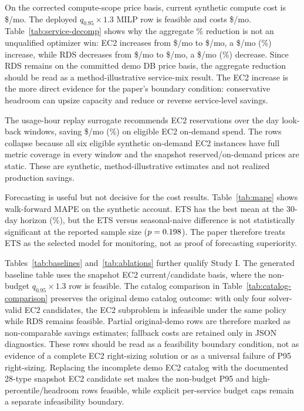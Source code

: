 \documentclass[conference]{IEEEtran}
\begin{document}
On the corrected compute-scope price basis, current synthetic compute cost is
\$\evidComputeCurrent{}/mo. The deployed $q_{0.95}\times1.3$ MILP row is
feasible and costs \$\evidPfiveCost{}/mo. Table~\ref{tab:service-decomp}
shows why the aggregate \evidPfiveSavingsPct\% reduction is not an
unqualified optimizer win: EC2 increases from \$\evidEcTwoCurrent{}/mo to
\$\evidEcTwoOptimized{}/mo, a \$\evidEcTwoDelta{}/mo
(\evidEcTwoDeltaPct\%) increase, while RDS decreases from
\$\evidRdsCurrent{}/mo to \$\evidRdsOptimized{}/mo, a
\$\evidRdsSavings{}/mo (\evidRdsSavingsPct\%) decrease. Since RDS remains on
the committed demo DB price basis, the aggregate reduction should be read as
a method-illustrative service-mix result. The EC2 increase is the more direct
evidence for the paper's boundary condition: conservative headroom can upsize
capacity and reduce or reverse service-level savings.

The usage-hour replay surrogate recommends \evidCommercialRecs{} EC2
reservations over the \evidCommercialLookbacks{} day look-back windows,
saving \$\evidCommercialSavings{}/mo (\evidCommercialSavingsPct\%) on
eligible EC2 on-demand spend. The rows collapse because all six eligible
synthetic on-demand EC2 instances have full metric coverage in every window
and the snapshot reserved/on-demand prices are static. These are synthetic,
method-illustrative estimates and not realized production savings.

Forecasting is useful but not decisive for the cost results. Table~\ref{tab:mape}
shows walk-forward MAPE on the synthetic account. ETS has the best mean at
the 30-day horizon (\mapeEts\%), but the ETS versus seasonal-naive difference
is not statistically significant at the reported sample size
($p=0.198$). The paper therefore treats ETS as the selected model for
monitoring, not as proof of forecasting superiority.

Tables~\ref{tab:baselines} and~\ref{tab:ablations} further qualify Study I.
The generated baseline table uses the snapshot EC2 current/candidate basis,
where the non-budget $q_{0.95}\times1.3$ row is feasible. The catalog
comparison in Table~\ref{tab:catalog-comparison} preserves the original demo
catalog outcome: with only four solver-valid EC2 candidates, the EC2
subproblem is infeasible under the same policy while RDS remains feasible.
Partial original-demo rows are therefore marked as non-comparable savings
estimates; fallback costs are retained only in JSON diagnostics. These rows
should be read as a feasibility boundary condition, not as evidence of a
complete EC2 right-sizing solution or as a universal failure of P95
right-sizing. Replacing the incomplete demo EC2 catalog with the documented
28-type snapshot EC2 candidate set makes the non-budget P95 and
high-percentile/headroom rows feasible, while explicit per-service budget caps
remain a separate infeasibility boundary.
\end{document}
